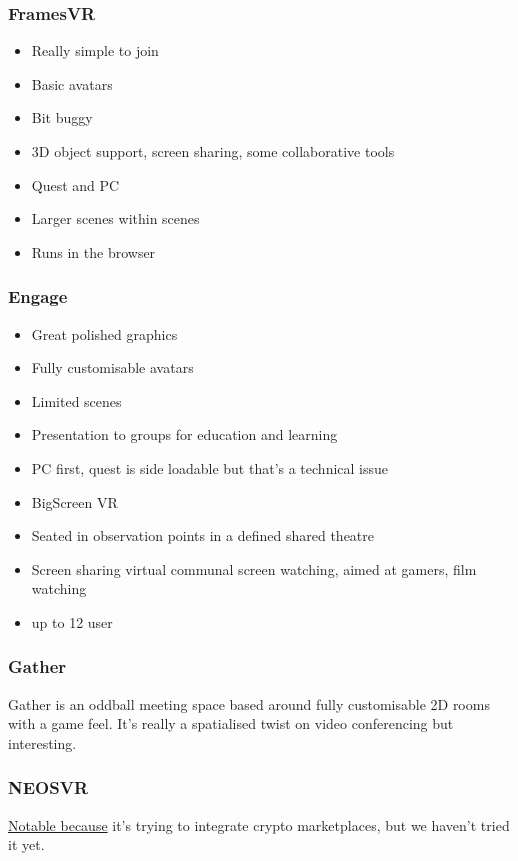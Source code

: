 \subsubsection{FramesVR}
\begin{itemize}
\item Really simple to join
\item Basic avatars
\item Bit buggy
\item 3D object support, screen sharing, some collaborative tools
\item Quest and PC
\item Larger scenes within scenes
\item Runs in the browser
\end{itemize}
\subsubsection{Engage}
\begin{itemize}
\item Great polished graphics
\item Fully customisable avatars
\item Limited scenes
\item Presentation to groups for education and learning
\item PC first, quest is side loadable but that's a technical issue
\item BigScreen VR
\item Seated in observation points in a defined shared theatre
\item Screen sharing virtual communal screen watching, aimed at gamers, film watching
\item up to 12 user
\end{itemize}
\subsubsection{Gather}
Gather is an oddball meeting space based around fully customisable 2D rooms with a game feel. It's really a spatialised twist on video conferencing but interesting.  
\subsubsection{NEOSVR}
\href{https://neos.com/}{Notable because} it's trying to integrate crypto marketplaces, but we haven't tried it yet.
